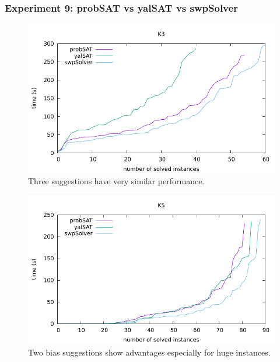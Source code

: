 \documentclass[12pt,a4paper,twoside]{scrartcl}
\numberwithin{equation}{section}
\begin{document}
\subsubsection{Experiment 9: probSAT vs yalSAT vs swpSolver } 
  \begin{figure}[H]
\begin{center}
  \includegraphics[scale = 1]{DATA/K3/e5.pdf}
  \end{center}
  \caption{Three suggestions have very similar performance.}
  \label{Experiment 9 k3-w cactus plot}
  \end{figure}
  \begin{figure}[H]
\begin{center}
  \includegraphics[scale = 1]{DATA/K5/e5.pdf}
  \end{center}
  \caption{Two bias suggestions show advantages especially for huge instances.}
  \label{Experiment 9 k5-w cactus plot}
  \end{figure}
\end{document}
